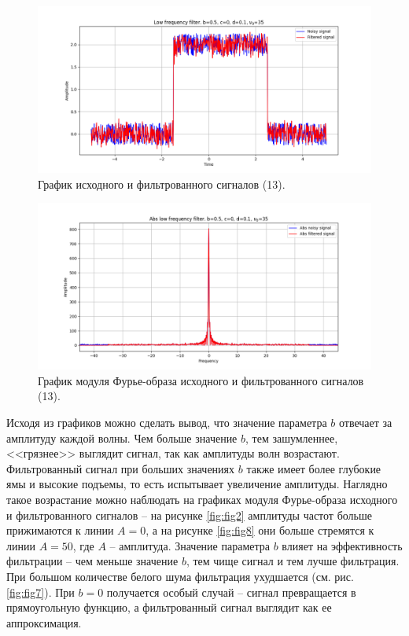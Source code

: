 \documentclass[a4paper, 12pt]{article}
\begin{document}
    \begin{figure}[!htb]
        \centering
        \includegraphics[scale=0.48]{9_u_flt_u_nohigh.png}
        \captionsetup{skip=0pt}
        \caption{График исходного и фильтрованного сигналов (13).}
        \label{fig:fig25}
    \end{figure}
    \begin{figure}[!htb]
        \centering
        \includegraphics[scale=0.48]{9_abs_u_U_nohigh.png}
        \captionsetup{skip=0pt}
        \caption{График модуля Фурье-образа исходного и фильтрованного сигналов (13).}
        \label{fig:fig26}
    \end{figure}


    Исходя из графиков можно сделать вывод, что значение параметра $b$ отвечает за амплитуду каждой волны.
    Чем больше значение $b$, тем зашумленнее, <<грязнее>> выглядит сигнал, так как амплитуды волн возрастают.
    Фильтрованный сигнал при больших значениях $b$ также имеет более глубокие ямы и высокие подъемы, то есть
    испытывает увеличение амплитуды. Наглядно такое возрастание можно наблюдать на графиках модуля Фурье-образа
    исходного и фильтрованного сигналов -- на рисунке \ref{fig:fig2} амплитуды частот больше прижимаются к линии 
    $A=0$, а на рисунке \ref{fig:fig8} они больше стремятся к линии $A=50$, где $A$ -- амплитуда. Значение
    параметра $b$ влияет на эффективность фильтрации -- чем меньше значение $b$, тем чище сигнал и тем лучше
    фильтрация. При большом количестве белого шума фильтрация ухудшается (см. рис. \ref{fig:fig7}).
    При $b=0$ получается особый случай -- сигнал превращается в прямоугольную функцию, а фильтрованный
    сигнал выглядит как ее аппроксимация.
\end{document}
